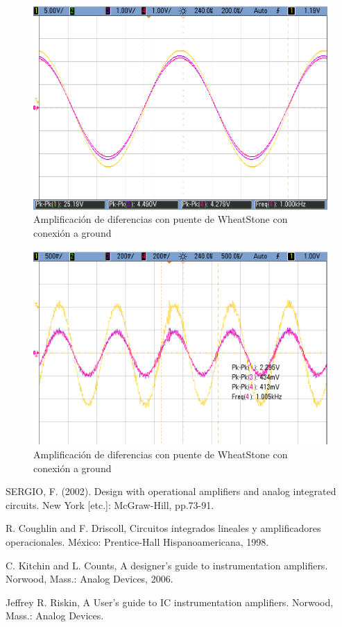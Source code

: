 \begin{figure}[H]
	\centering
	\includegraphics[height=0.3\textheight]{./ImagenesDeOsciloscopio/WheatStoneTierra1.png}
	\caption{Amplificación de diferencias con puente de WheatStone con conexión a ground}
\end{figure}

\begin{figure}[H]
	\centering
	\includegraphics[height=0.3\textheight]{./ImagenesDeOsciloscopio/WheatstoneAislado.png}
	\caption{Amplificación de diferencias con puente de WheatStone con conexión a ground}
\end{figure}




 	
\begin{thebibliography}{9}
	
	SERGIO, F. (2002). Design with operational amplifiers and analog integrated circuits. New York [etc.]: McGraw-Hill, pp.73-91.	
	
	R. Coughlin and F. Driscoll, Circuitos integrados lineales y amplificadores operacionales. México: Prentice-Hall Hispanoamericana, 1998.
	
	C. Kitchin and L. Counts, A designer's guide to instrumentation amplifiers. Norwood, Mass.: Analog Devices, 2006.
	
	Jeffrey R. Riskin, A User's guide to IC instrumentation amplifiers. Norwood, Mass.: Analog Devices.
	
\end{thebibliography}
